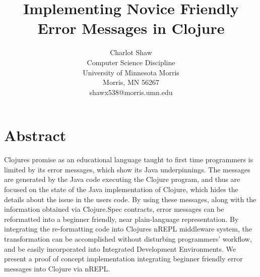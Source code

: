 \documentclass[12pt]{article}
\newcommand{\comment}[1]{{\bf \tt  {#1}}}
\begin{document}
\pagestyle{plain}
%

\title{Implementing Novice Friendly Error Messages in Clojure}
%
%

\author{
Charlot Shaw \\
Computer Science Discipline \\
University of Minnesota Morris\\
Morris, MN 56267\\
shawx538@morris.umn.edu
}
\maketitle
\thispagestyle{empty}

\section*{\centering Abstract}
Clojures promise as an educational language taught to first time programmers is
limited by its error messages, which show its Java underpinnings. The messages
are generated by the Java code executing the Clojure program, and thus are
focused on the state of the Java implementation of Clojure,
which hides the details about the issue in the users code.
By using these messages, along with the information obtained via Clojure.Spec contracts,
 error messages can be reformatted into a beginner friendly, near plain-language representation.
 By integrating the re-formatting code into Clojures nREPL middleware system, the
 transformation can be accomplished without disturbing programmers' workflow, and be easily
 incorporated into Integrated Development Environments.
We present a proof of concept implementation
integrating beginner friendly error messages into Clojure via nREPL.
\end{document}
